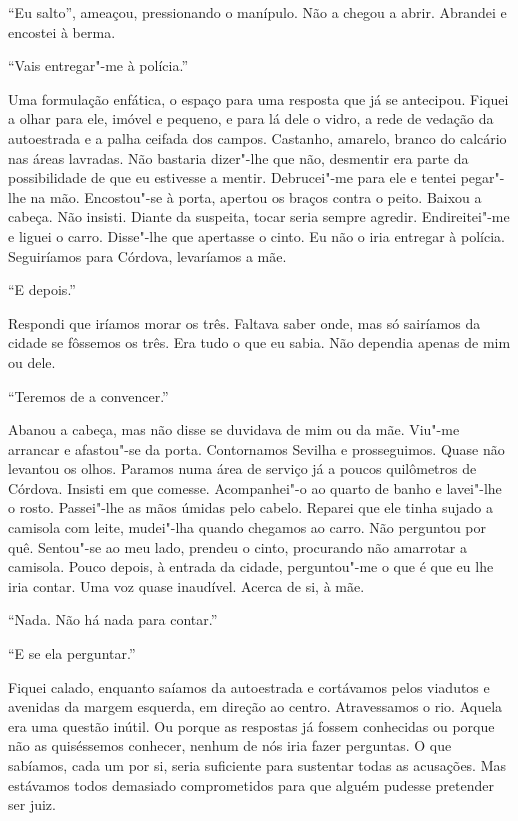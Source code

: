 ``Eu salto'',
ameaçou, pressionando o manípulo. Não a chegou a abrir. Abrandei e
encostei à berma.

``Vais entregar"-me à polícia.''

Uma formulação enfática, o espaço para uma resposta que já se antecipou.
Fiquei a olhar para ele, imóvel e pequeno, e para lá dele o vidro, a
rede de vedação da autoestrada e a palha ceifada dos campos. Castanho,
amarelo, branco do calcário nas áreas lavradas. Não bastaria dizer"-lhe
que não, desmentir era parte da possibilidade de que eu estivesse a
mentir. Debrucei"-me para ele e tentei pegar"-lhe na mão. Encostou"-se à
porta, apertou os braços contra o peito. Baixou a cabeça. Não insisti.
Diante da suspeita, tocar seria sempre agredir. Endireitei"-me e liguei
o carro. Disse"-lhe que apertasse o cinto. Eu não o iria entregar à
polícia. Seguiríamos para Córdova, levaríamos a mãe.

``E depois.''

Respondi que iríamos morar os três. Faltava saber onde, mas só sairíamos
da cidade se fôssemos os três. Era tudo o que eu sabia. Não dependia
apenas de mim ou dele.

``Teremos de a convencer.''

Abanou a cabeça, mas não disse se duvidava de mim ou da mãe. Viu"-me
arrancar e afastou"-se da porta. Contornamos Sevilha e prosseguimos.
Quase não levantou os olhos. Paramos numa área de serviço já a poucos
quilômetros de Córdova. Insisti em que comesse. Acompanhei"-o ao quarto
de banho e lavei"-lhe o rosto. Passei"-lhe as mãos úmidas pelo cabelo.
Reparei que ele tinha sujado a camisola com leite, mudei"-lha quando
chegamos ao carro. Não perguntou por quê. Sentou"-se ao meu lado, prendeu
o cinto, procurando não amarrotar a camisola. Pouco depois, à entrada da
cidade, perguntou"-me o que é que eu lhe iria contar. Uma voz quase
inaudível. Acerca de si, à mãe.

``Nada. Não há nada para contar.''

``E se ela perguntar.''

Fiquei calado, enquanto saíamos da autoestrada e cortávamos pelos
viadutos e avenidas da margem esquerda, em direção ao centro.
Atravessamos o rio. Aquela era uma questão inútil. Ou porque as
respostas já fossem conhecidas ou porque não as quiséssemos conhecer,
nenhum de nós iria fazer perguntas. O que sabíamos, cada um por si,
seria suficiente para sustentar todas as acusações. Mas estávamos todos
demasiado comprometidos para que alguém pudesse pretender ser juiz.

